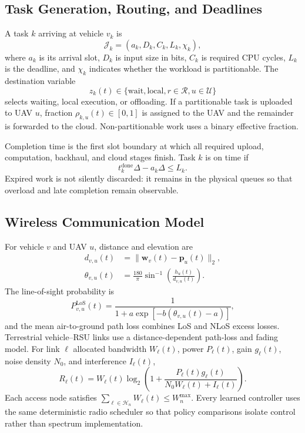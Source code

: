\documentclass[journal]{IEEEtran}
\newcommand{\vect}[1]{\boldsymbol{#1}}
\begin{document}
\subsection{Task Generation, Routing, and Deadlines}
A task $k$ arriving at vehicle $v_k$ is
\begin{equation}
\mathcal J_k=(a_k,D_k,C_k,L_k,\chi_k),
\end{equation}
where $a_k$ is its arrival slot, $D_k$ is input size in bits, $C_k$ is
required CPU cycles, $L_k$ is the deadline, and $\chi_k$ indicates whether
the workload is partitionable. The destination variable
\begin{equation}
z_k(t)\in\{\text{wait},\text{local},r\in\mathcal R,u\in\mathcal U\}
\end{equation}
selects waiting, local execution, or offloading. If a partitionable task is
uploaded to UAV $u$, fraction $\rho_{k,u}(t)\in[0,1]$ is assigned to the UAV
and the remainder is forwarded to the cloud. Non-partitionable work uses a
binary effective fraction.

Completion time is the first slot boundary at which all required upload,
computation, backhaul, and cloud stages finish. Task $k$ is on time if
\begin{equation}
t_k^{\mathrm{done}}\Delta-a_k\Delta\le L_k.
\end{equation}
Expired work is not silently discarded: it remains in the physical queues so
that overload and late completion remain observable.

\subsection{Wireless Communication Model}
For vehicle $v$ and UAV $u$, distance and elevation are
\begin{align}
d_{v,u}(t)&=\|\vect w_v(t)-\vect p_u(t)\|_2,\\
\theta_{v,u}(t)&=\frac{180}{\pi}\sin^{-1}
\left(\frac{h_u(t)}{d_{v,u}(t)}\right).
\end{align}
The line-of-sight probability is
\begin{equation}
P_{v,u}^{\mathrm{LoS}}(t)=
\frac{1}{1+a\exp[-b(\theta_{v,u}(t)-a)]},
\end{equation}
and the mean air-to-ground path loss combines LoS and NLoS excess losses.
Terrestrial vehicle--RSU links use a distance-dependent path-loss and fading
model. For link $\ell$ allocated bandwidth $W_\ell(t)$, power $P_\ell(t)$,
gain $g_\ell(t)$, noise density $N_0$, and interference $I_\ell(t)$,
\begin{equation}
R_\ell(t)=W_\ell(t)\log_2\left(1+
\frac{P_\ell(t)g_\ell(t)}{N_0W_\ell(t)+I_\ell(t)}\right).
\end{equation}
Each access node satisfies $\sum_{\ell\in\mathcal H_n}W_\ell(t)\le
W_n^{\max}$. Every learned controller uses the same deterministic radio
scheduler so that policy comparisons isolate control rather than spectrum
implementation.
\end{document}

